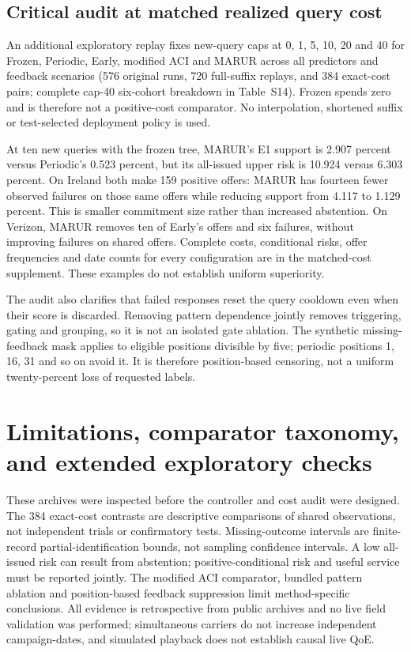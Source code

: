 \documentclass[journal,onecolumn,10pt]{IEEEtran}
\begin{document}
\subsection{Critical audit at matched realized query cost}
An additional exploratory replay fixes new-query caps at 0, 1, 5, 10, 20 and 40 for Frozen, Periodic, Early, modified ACI and MARUR across all predictors and feedback scenarios (576 original runs, 720 full-suffix replays, and 384 exact-cost pairs; complete cap-40 six-cohort breakdown in Table~S14). Frozen spends zero and is therefore not a positive-cost comparator. No interpolation, shortened suffix or test-selected deployment policy is used.



At ten new queries with the frozen tree, MARUR's E1 support is 2.907 percent versus Periodic's 0.523 percent, but its all-issued upper risk is 10.924 versus 6.303 percent. On Ireland both make 159 positive offers: MARUR has fourteen fewer observed failures on those same offers while reducing support from 4.117 to 1.129 percent. This is smaller commitment size rather than increased abstention. On Verizon, MARUR removes ten of Early's offers and six failures, without improving failures on shared offers. Complete costs, conditional risks, offer frequencies and date counts for every configuration are in the matched-cost supplement. These examples do not establish uniform superiority.

The audit also clarifies that failed responses reset the query cooldown even when their score is discarded. Removing pattern dependence jointly removes triggering, gating and grouping, so it is not an isolated gate ablation. The synthetic missing-feedback mask applies to eligible positions divisible by five; periodic positions 1, 16, 31 and so on avoid it. It is therefore position-based censoring, not a uniform twenty-percent loss of requested labels.

\section{Limitations, comparator taxonomy, and extended exploratory checks}
These archives were inspected before the controller and cost audit were designed. The 384 exact-cost contrasts are descriptive comparisons of shared observations, not independent trials or confirmatory tests. Missing-outcome intervals are finite-record partial-identification bounds, not sampling confidence intervals. A low all-issued risk can result from abstention; positive-conditional risk and useful service must be reported jointly. The modified ACI comparator, bundled pattern ablation and position-based feedback suppression limit method-specific conclusions. All evidence is retrospective from public archives and no live field validation was performed; simultaneous carriers do not increase independent campaign-dates, and simulated playback does not establish causal live QoE.
\end{document}
